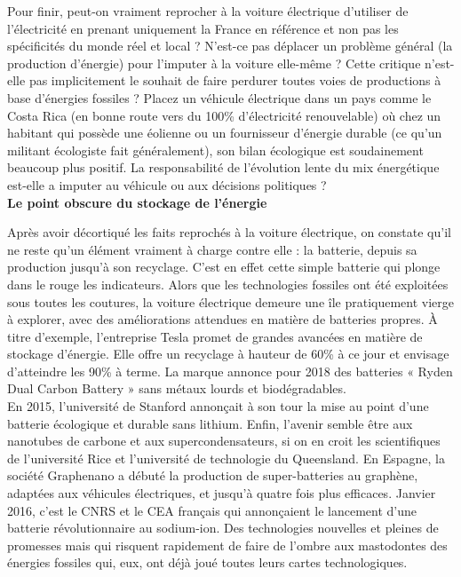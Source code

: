 \documentclass[8pt]{article}
\begin{document}
Pour finir, peut-on vraiment reprocher à la voiture électrique d’utiliser de l’électricité en prenant uniquement la France en référence et non pas les spécificités du monde réel et local ? N’est-ce pas déplacer un problème général (la production d’énergie) pour l’imputer à la voiture elle-même ? Cette critique n’est-elle pas implicitement le souhait de faire perdurer toutes voies de productions à base d’énergies fossiles ? Placez un véhicule électrique dans un pays comme le Costa Rica (en bonne route vers du 100\% d’électricité renouvelable) où chez un habitant qui possède une éolienne ou un fournisseur d’énergie durable (ce qu’un militant écologiste fait généralement), son bilan écologique est soudainement beaucoup plus positif. La responsabilité de l’évolution lente du mix énergétique est-elle a imputer au véhicule ou aux décisions politiques ? \\

\textbf{Le point obscure du stockage de l’énergie}


Après avoir décortiqué les faits reprochés à la voiture électrique, on constate qu’il ne reste qu’un élément vraiment à charge contre elle : la batterie, depuis sa production jusqu’à son recyclage. C’est en effet cette simple batterie qui plonge dans le rouge les indicateurs. Alors que les technologies fossiles ont été exploitées sous toutes les coutures, la voiture électrique demeure une île pratiquement vierge à explorer, avec des améliorations attendues en matière de batteries propres. À titre d’exemple, l’entreprise Tesla promet de grandes avancées en matière de stockage d’énergie. Elle offre un recyclage à hauteur de 60\% à ce jour et envisage d’atteindre les 90\% à terme. La marque annonce pour 2018 des batteries « Ryden Dual Carbon Battery » sans métaux lourds et biodégradables.\\

En 2015, l’université de Stanford annonçait à son tour la mise au point d’une batterie écologique et durable sans lithium. Enfin, l’avenir semble être aux nanotubes de carbone et aux supercondensateurs, si on en croit les scientifiques de l’université Rice et l’université de technologie du Queensland. En Espagne, la société Graphenano a débuté la production de super-batteries au graphène, adaptées aux véhicules électriques, et jusqu’à quatre fois plus efficaces. Janvier 2016, c’est le CNRS et le CEA français qui annonçaient le lancement d’une batterie révolutionnaire au sodium-ion. Des technologies nouvelles et pleines de promesses mais qui risquent rapidement de faire de l’ombre aux mastodontes des énergies fossiles qui, eux, ont déjà joué toutes leurs cartes technologiques.\\
\end{document}
